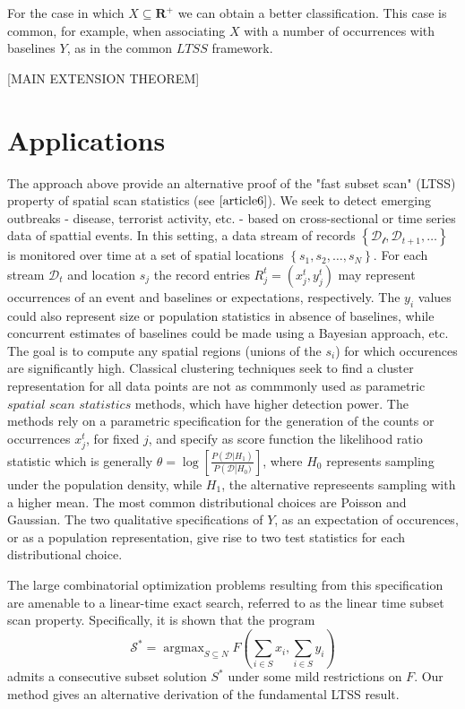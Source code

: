 \documentclass{article}
\theoremstyle{case}
\DeclareMathOperator*{\argmax}{argmax} %
\begin{document}
For the case in which $X \subseteq \mathbf{R}^+$ we can obtain a better classification. This case is common, for example, when associating $X$ with a number of occurrences with baselines $Y$, as in the common $LTSS$ framework.

[MAIN EXTENSION THEOREM]

\section{Applications}

The approach above provide an alternative proof of the "fast subset scan" (LTSS) property of spatial scan statistics (see $\cite{article6}$). We seek to detect emerging outbreaks - disease, terrorist activity, etc. - based on cross-sectional or time series data of spattial events. In this setting, a data stream of records $\left\lbrace \mathcal{D_t}, \mathcal{D}_{t+1}, \dots \right\rbrace$ is monitored over time at a set of spatial locations $\left\lbrace s_1, s_2, \dots, s_N \right\rbrace$. For each stream $\mathcal{D}_t$ and location $s_j$ the record entries $R^t_j = (x^t_j, y^t_j)$ may represent occurrences of an event and baselines or expectations, respectively. The $y_i$ values could also represent size or population statistics in absence of baselines, while concurrent estimates of baselines could be made using a Bayesian approach, etc. The goal is to compute any spatial regions (unions of the $s_i$) for which occurences are significantly high. Classical clustering techniques seek to find a cluster representation for all data points are not as commmonly used as parametric $\textit{spatial scan statistics}$ methods, which have higher detection power. The methods rely on a parametric specification for the generation of the counts or occurrences $x^t_j$, for fixed $j$, and specify as score function the likelihood ratio statistic which is generally $\theta = \log\left[ \frac{P\left( \mathcal{D} | H_1\right)}{P\left( \mathcal{D}\right | H_0)}\right]$, where $H_0$ represents sampling under the population density, while $H_1$, the alternative represeents sampling with a higher mean. The most common distributional choices are Poisson and Gaussian. The two qualitative specifications of $Y$, as an expectation of occurences, or as a population representation, give rise to two test statistics for each distributional choice. 

The large combinatorial optimization problems resulting from this specification are amenable to a linear-time exact search, referred to as the linear time subset scan property. Specifically, it is shown that the program
\[
\mathcal{S^*} = \argmax_{S \subseteq N} F(\sum_{i \in S}x_i, \sum_{i \in S}y_i)
\]
admits a consecutive subset solution $S^*$ under some mild restrictions on $F$. Our method gives an alternative derivation of the fundamental LTSS result.
\end{document}
